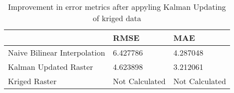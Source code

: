 \begin{table}
\caption{Improvement in error metrics after appyling Kalman Updating of kriged data}
\label{tab:Stcroix_lidar_error}
\begin{tabular}{lll}
\toprule
 & RMSE & MAE \\
\midrule
Naive Bilinear Interpolation & 6.427786 & 4.287048 \\
Kalman Updated Raster & 4.623898 & 3.212061 \\
Kriged Raster & Not Calculated & Not Calculated \\
\bottomrule
\end{tabular}
\end{table}
